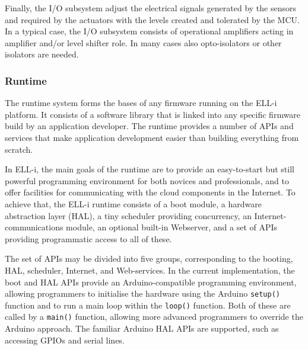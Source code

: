 \documentclass{siamltex}
\begin{document}
Finally, the I/O subsystem adjust the electrical signals generated by
the sensors and required by the actuators with the levels created and
tolerated by the MCU.  In a typical case, the I/O subsystem consists
of operational amplifiers acting in amplifier and/or level shifter
role.  In many cases also opto-isolators or other isolators are needed.


\subsubsection{Runtime}
\label{sssec:runtime}

The runtime system forms the bases of any firmware running on the
ELL-i platform.  It consists of a software library that
is linked into any specific firmware build by an application
developer.  The runtime provides a number of APIs and services that make
application development easier than building everything from scratch.

In ELL-i, the main goals of the runtime are to provide an
easy-to-start but still powerful programming environment for both
novices and professionals, and to offer facilities for communicating
with the cloud components in the Internet.  To achieve that, the ELL-i
runtime consists of a boot module, a hardware abstraction layer (HAL),
a tiny scheduler providing concurrency, an Internet-communications
module, an optional built-in Webserver, and a set of APIs providing
programmatic access to all of these.


The set of APIs may be divided into five groups, corresponding to the
booting, HAL, scheduler, Internet, and Web-services.  In the current
implementation, the boot and HAL APIs provide an Arduino-compatible
programming environment, allowing programmers to initialise the
hardware using the Arduino \hbox{\tt setup()} function and to run a
main loop within the \hbox{\tt loop()} function.  Both of these are
called by a \hbox{\tt main()} function, allowing more advanced
programmers to override the Arduino approach.  The familiar Arduino
HAL APIs are supported, such as accessing GPIOs and serial lines.
\end{document}

